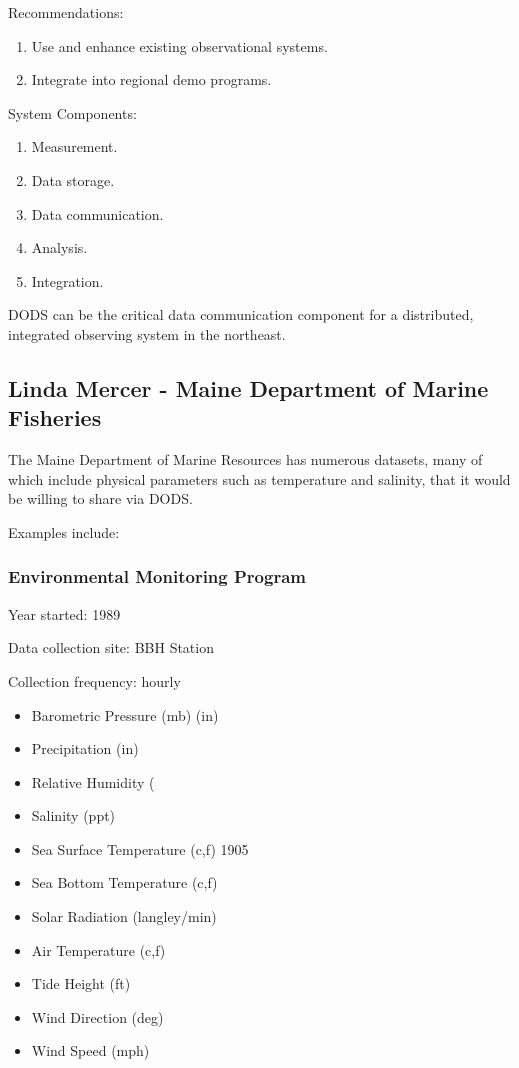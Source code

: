Recommendations:
\begin{enumerate}
\item Use and enhance existing observational systems.
\item Integrate into regional demo programs.
\end{enumerate}

System Components:
\begin{enumerate}
\item Measurement.
\item Data storage.
\item Data communication.
\item Analysis.
\item Integration.
\end{enumerate}

DODS can be the critical data communication component for a
distributed, integrated observing system in the northeast.


\subsection{Linda Mercer - Maine Department of Marine Fisheries}

The Maine Department of Marine Resources has numerous datasets, many
of which include physical parameters such as temperature and salinity,
that it would be willing to share via DODS.

Examples include:

\subsubsection{Environmental Monitoring Program }

Year started: 1989

Data collection site: BBH Station

Collection frequency: hourly

\begin{itemize}
\item Barometric Pressure (mb) (in)
\item Precipitation (in)
\item Relative Humidity (%
\item Salinity (ppt)    
\item Sea Surface Temperature (c,f) 1905
\item Sea Bottom Temperature (c,f) 
\item Solar Radiation (langley/min)
\item Air Temperature (c,f)
\item Tide Height (ft)
\item Wind Direction (deg) 
\item Wind Speed (mph)
\end{itemize}

